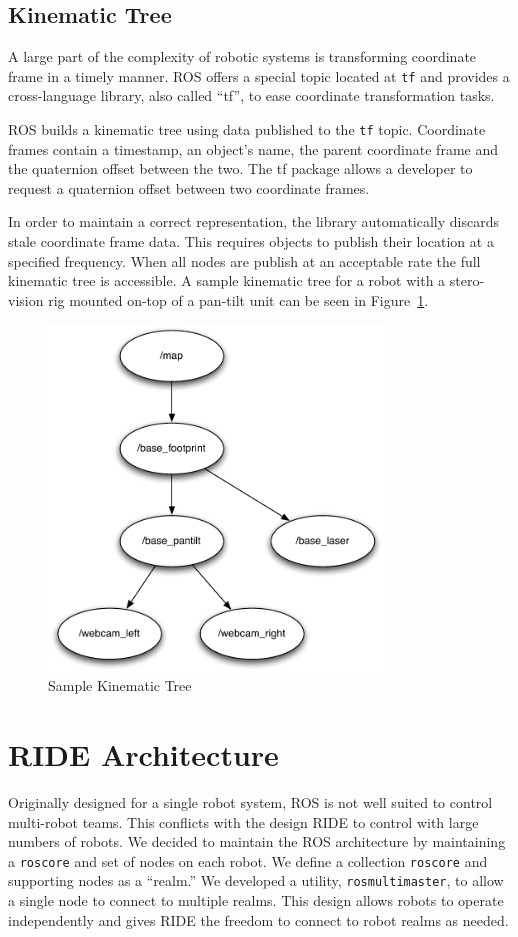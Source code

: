 \subsection{Kinematic Tree}
\label{sub:ros_tf}
A large part of the complexity of robotic systems is transforming coordinate frame in a timely manner. ROS offers a special topic located at \verb!tf! and provides a cross-language library, also called ``tf'', to ease coordinate transformation tasks.

ROS builds a kinematic tree using data published to the \verb!tf! topic. Coordinate frames contain a timestamp, an object's name, the parent coordinate frame and the quaternion offset between the two. The tf package allows a developer to request a quaternion offset between two coordinate frames. 

In order to maintain a correct representation, the library automatically discards stale coordinate frame data. This requires objects to publish their location at a specified frequency. When all nodes are publish at an acceptable rate the full kinematic tree is accessible. A sample kinematic tree for a robot with a stero-vision rig mounted on-top of a pan-tilt unit can be seen in Figure~\ref{fig:tf-example}.

\begin{figure}[ht]
\begin{center}
\includegraphics[width=3.5in]{images/tf-example.pdf}
\caption{Sample Kinematic Tree\label{fig:tf-example}}
\end{center}
\end{figure}

\section{RIDE Architecture}
\label{sec:ride_code}
Originally designed for a single robot system, ROS is not well suited to control multi-robot teams. This conflicts with the design RIDE to control with large numbers of robots. We decided to maintain the ROS architecture by maintaining a \verb!roscore! and set of nodes on each robot. We define a collection \verb!roscore! and supporting nodes as a ``realm.'' We developed a utility, \verb!rosmultimaster!, to allow a single node to connect to multiple realms. This design allows robots to operate independently and gives RIDE the freedom to connect to robot realms as needed.

